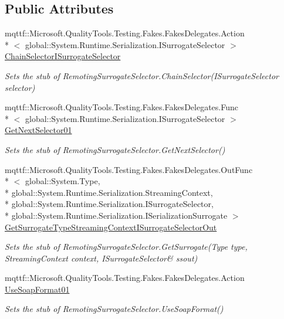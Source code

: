 \subsection*{Public Attributes}
\begin{DoxyCompactItemize}
\item 
mqttf\-::\-Microsoft.\-Quality\-Tools.\-Testing.\-Fakes.\-Fakes\-Delegates.\-Action\\*
$<$ global\-::\-System.\-Runtime.\-Serialization.\-I\-Surrogate\-Selector $>$ \hyperlink{class_system_1_1_runtime_1_1_remoting_1_1_messaging_1_1_fakes_1_1_stub_remoting_surrogate_selector_a52aa2933654ae6283846fe1785a6d078}{Chain\-Selector\-I\-Surrogate\-Selector}
\begin{DoxyCompactList}\small\item\em Sets the stub of Remoting\-Surrogate\-Selector.\-Chain\-Selector(\-I\-Surrogate\-Selector selector)\end{DoxyCompactList}\item 
mqttf\-::\-Microsoft.\-Quality\-Tools.\-Testing.\-Fakes.\-Fakes\-Delegates.\-Func\\*
$<$ global\-::\-System.\-Runtime.\-Serialization.\-I\-Surrogate\-Selector $>$ \hyperlink{class_system_1_1_runtime_1_1_remoting_1_1_messaging_1_1_fakes_1_1_stub_remoting_surrogate_selector_a39b62aa6e07250c70be2f93cca31d165}{Get\-Next\-Selector01}
\begin{DoxyCompactList}\small\item\em Sets the stub of Remoting\-Surrogate\-Selector.\-Get\-Next\-Selector()\end{DoxyCompactList}\item 
mqttf\-::\-Microsoft.\-Quality\-Tools.\-Testing.\-Fakes.\-Fakes\-Delegates.\-Out\-Func\\*
$<$ global\-::\-System.\-Type, \\*
global\-::\-System.\-Runtime.\-Serialization.\-Streaming\-Context, \\*
global\-::\-System.\-Runtime.\-Serialization.\-I\-Surrogate\-Selector, \\*
global\-::\-System.\-Runtime.\-Serialization.\-I\-Serialization\-Surrogate $>$ \hyperlink{class_system_1_1_runtime_1_1_remoting_1_1_messaging_1_1_fakes_1_1_stub_remoting_surrogate_selector_a9a7c9d456f8f1ace540750b3f3474fba}{Get\-Surrogate\-Type\-Streaming\-Context\-I\-Surrogate\-Selector\-Out}
\begin{DoxyCompactList}\small\item\em Sets the stub of Remoting\-Surrogate\-Selector.\-Get\-Surrogate(Type type, Streaming\-Context context, I\-Surrogate\-Selector\& ssout)\end{DoxyCompactList}\item 
mqttf\-::\-Microsoft.\-Quality\-Tools.\-Testing.\-Fakes.\-Fakes\-Delegates.\-Action \hyperlink{class_system_1_1_runtime_1_1_remoting_1_1_messaging_1_1_fakes_1_1_stub_remoting_surrogate_selector_a68c50b5cf05fb965e5dd75a1afa8b27c}{Use\-Soap\-Format01}
\begin{DoxyCompactList}\small\item\em Sets the stub of Remoting\-Surrogate\-Selector.\-Use\-Soap\-Format()\end{DoxyCompactList}\end{DoxyCompactItemize}
